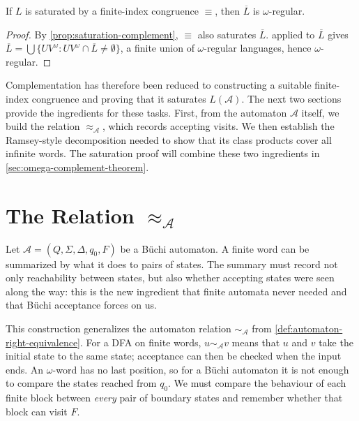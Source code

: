 \begin{corollary}
\label{cor:complement-from-saturation}
If $L$ is saturated by a finite-index congruence $\equiv$, then
$\overline{L}$ is $\omega$-regular.
\end{corollary}

\begin{proof}
By \cref{prop:saturation-complement}, $\equiv$ also saturates
$\overline{L}$.   applied to
$\overline{L}$ gives
$\overline{L}=\bigcup\{UV^\omega : UV^\omega\cap\overline{L}\neq\emptyset\}$,
a finite union of $\omega$-regular languages, hence $\omega$-regular.
\end{proof}

Complementation has therefore been reduced to constructing a suitable
finite-index congruence and proving that it saturates $L(\mathcal A)$.
The next two sections provide the ingredients for these tasks.  First,
from the automaton $\mathcal A$ itself, we build the relation
$\approx_{\mathcal A}$, which records accepting visits.  We then establish the Ramsey-style
decomposition needed to show that its class products cover all infinite
words.  The saturation proof will combine these two ingredients in
\cref{sec:omega-complement-theorem}.


\section{The Relation \texorpdfstring{$\approx_{\mathcal A}$}{≈𝒜}}
\label{sec:automaton-congruence}

Let $\mathcal A=(Q,\Sigma,\Delta,q_0,F)$ be a B\"uchi automaton.  A finite word
can be summarized by what it does to pairs of states.  The summary must
record not only reachability between states, but also whether accepting
states were seen along the way: this is the new ingredient that finite
automata never needed and that B\"uchi acceptance forces on us.

This construction generalizes the automaton relation
$\sim_{\mathcal A}$ from \cref{def:automaton-right-equivalence}.  For a
DFA on finite words, $u\sim_{\mathcal A}v$ means that $u$ and $v$ take
the initial state to the same state; acceptance can then be checked when
the input ends.  An $\omega$-word has no last position, so for a B\"uchi
automaton it is not enough to compare the states reached from $q_0$.
We must compare the behaviour of each finite block between \emph{every}
pair of boundary states and remember whether that block can visit $F$.

